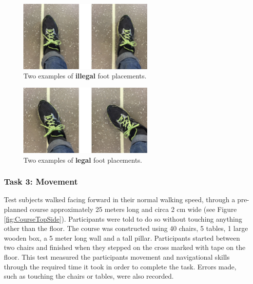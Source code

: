 \documentclass[runningheads,a4paper,oribibl]{llncs}
\begin{document}
\begin{figure}
   \centering
   \includegraphics[width=0.6\textwidth]{ExternalMaterial/Illegal}
   \caption{Two examples of \textbf{illegal} foot placements.} \label{fig:Illegal}
\end{figure}
\begin{figure}
   \centering
   \includegraphics[width=0.6\textwidth]{ExternalMaterial/Legal}
   \caption{Two examples of \textbf{legal} foot placements.} \label{fig:Legal}
\end{figure}



\subsubsection{Task 3: Movement}

Test subjects walked facing forward in their normal walking speed, through a pre-planned course approximately 25 meters long and circa 2 cm wide (see Figure \ref{fig:CourseTopSide}). Participants were told to do so without touching anything other than the floor. The course was constructed using 40 chairs, 5 tables, 1 large wooden box, a 5 meter long wall and a tall pillar. Participants started between two chairs and finished when they stepped on the cross marked with tape on the floor. This test measured the participants movement and navigational skills through the required time it took in order to complete the task. Errors made, such as touching the chairs or tables, were also recorded.
\end{document}
